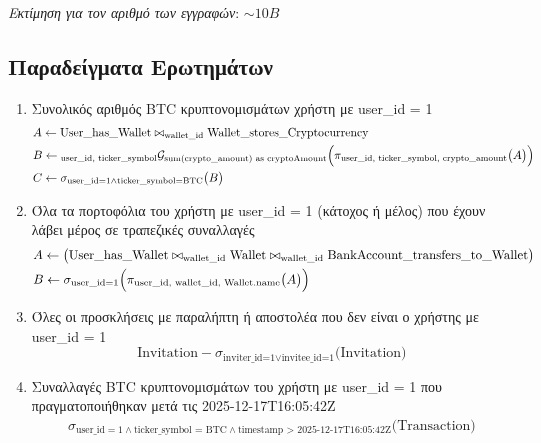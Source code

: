 \begin{flushright}
\textit{Εκτίμηση για τον αριθμό των εγγραφών}: $\sim10B$
\end{flushright}

\newpage

\subsection{Παραδείγματα Ερωτημάτων}

\begin{enumerate}

\item Συνολικός αριθμός BTC κρυπτονομισμάτων χρήστη με user\_id = 1
\[
\begin{aligned}
&A \leftarrow \text{User\_has\_Wallet}
\bowtie_{\text{wallet\_id}} \text{Wallet\_stores\_Cryptocurrency}
\\
&B \leftarrow
{}_{\text{user\_id, ticker\_symbol}}\mathcal{G}_{\text{sum(crypto\_amount) as cryptoAmount}}
\Bigl(\pi_{\text{user\_id, ticker\_symbol, crypto\_amount}} \bigl(A\bigr)\Bigr) \\
&C \leftarrow \sigma_{\text{user\_id=1} \land \text{ticker\_symbol=BTC}}\bigl(B\bigr)
\end{aligned}
\]

\item Όλα τα πορτοφόλια του χρήστη με user\_id = 1 (κάτοχος ή μέλος) που έχουν λάβει μέρος σε τραπεζικές συναλλαγές
\[
\begin{aligned}
&A \leftarrow 
\bigl(
  \text{User\_has\_Wallet} \bowtie_{\text{wallet\_id}}
  \text{Wallet} \bowtie_{\text{wallet\_id}}
  \text{BankAccount\_transfers\_to\_Wallet}
\bigr) \\
&B \leftarrow \sigma_{\text{user\_id=1}} \Bigl(\pi_{\text{user\_id, wallet\_id, Wallet.name}}
\bigl(A\bigr)\Bigr) \\
\end{aligned}
\]

\item Όλες οι προσκλήσεις με παραλήπτη ή αποστολέα που δεν είναι ο χρήστης με user\_id = 1
\[
\text{Invitation} - \sigma_{\text{inviter\_id=1} \lor \text{invitee\_id=1}}\bigl(\text{Invitation}\bigr)
\]

\item Συναλλαγές BTC κρυπτονομισμάτων του χρήστη με user\_id = 1 που πραγματοποιήθηκαν μετά τις
2025-12-17T16:05:42Z
\[
\begin{aligned}
\sigma_{\text{user\_id} = 1 \land \text{ticker\_symbol = BTC} \land 
\text{timestamp > 2025-12-17T16:05:42Z}} \bigl(\text{Transaction}\bigr)
\end{aligned}
\]


\end{enumerate}